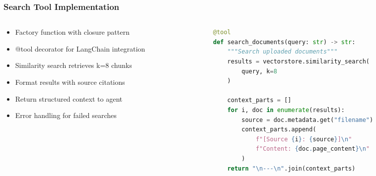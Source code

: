 \begin{frame}[fragile]\frametitle{Search Tool Implementation}
\begin{columns}
    \begin{column}[T]{0.5\linewidth}
      \begin{itemize}
        \item Factory function with closure pattern
        \item @tool decorator for LangChain integration
        \item Similarity search retrieves k=8 chunks
        \item Format results with source citations
        \item Return structured context to agent
        \item Error handling for failed searches
      \end{itemize}
    \end{column}
    \begin{column}[T]{0.5\linewidth}
      \begin{lstlisting}[language=python, basicstyle=\tiny]
@tool
def search_documents(query: str) -> str:
    """Search uploaded documents"""
    results = vectorstore.similarity_search(
        query, k=8
    )
    
    context_parts = []
    for i, doc in enumerate(results):
        source = doc.metadata.get("filename")
        context_parts.append(
            f"[Source {i}: {source}]\n"
            f"Content: {doc.page_content}\n"
        )
    return "\n---\n".join(context_parts)
      \end{lstlisting}
    \end{column}
  \end{columns}
\end{frame}


